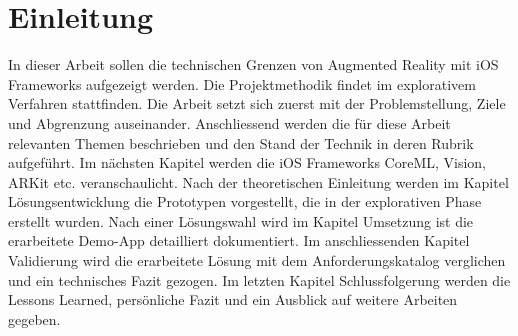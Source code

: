 \section{Einleitung}

In dieser Arbeit sollen die technischen Grenzen von Augmented Reality mit iOS Frameworks aufgezeigt werden. Die Projektmethodik findet im explorativem Verfahren stattfinden. 
Die Arbeit setzt sich zuerst mit der Problemstellung, Ziele und Abgrenzung auseinander. Anschliessend werden die für diese Arbeit relevanten Themen beschrieben und den Stand der Technik in deren Rubrik aufgeführt. Im nächsten Kapitel werden die iOS Frameworks CoreML, Vision, ARKit etc. veranschaulicht. Nach der theoretischen Einleitung werden im Kapitel Lösungsentwicklung die Prototypen vorgestellt, die in der explorativen Phase erstellt wurden. Nach einer Lösungswahl wird im Kapitel Umsetzung ist die erarbeitete Demo-App detailliert dokumentiert. Im anschliessenden Kapitel Validierung wird die erarbeitete Lösung mit dem Anforderungskatalog verglichen und ein technisches Fazit gezogen. Im letzten Kapitel Schlussfolgerung werden die Lessons Learned, persönliche Fazit und ein Ausblick auf weitere Arbeiten gegeben.
